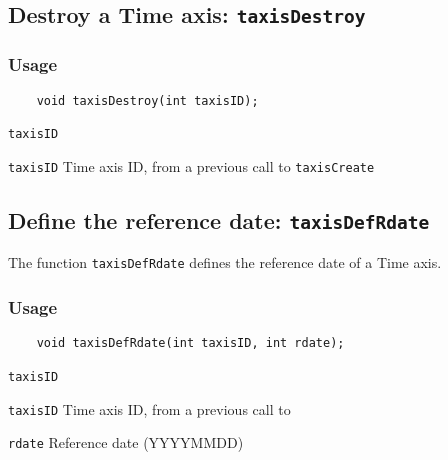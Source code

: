 \subsection{Destroy a Time axis: \texttt{taxisDestroy}}
\label{taxisDestroy}
\subsubsection*{Usage}

\begin{verbatim}
    void taxisDestroy(int taxisID);
\end{verbatim}

\hspace*{4mm}\begin{minipage}[]{15cm}
\begin{deflist}{\texttt{taxisID}\ }
\item[\texttt{taxisID}]
Time axis ID, from a previous call to {\texttt{taxisCreate}}

\end{deflist}
\end{minipage}


\subsection{Define the reference date: \texttt{taxisDefRdate}}
\label{taxisDefRdate}

The function {\texttt{taxisDefRdate}} defines the reference date of a Time axis.

\subsubsection*{Usage}

\begin{verbatim}
    void taxisDefRdate(int taxisID, int rdate);
\end{verbatim}

\hspace*{4mm}\begin{minipage}[]{15cm}
\begin{deflist}{\texttt{taxisID}\ }
\item[\texttt{taxisID}]
Time axis ID, from a previous call to {}
\item[\texttt{rdate}]
Reference date (YYYYMMDD)

\end{deflist}
\end{minipage}


